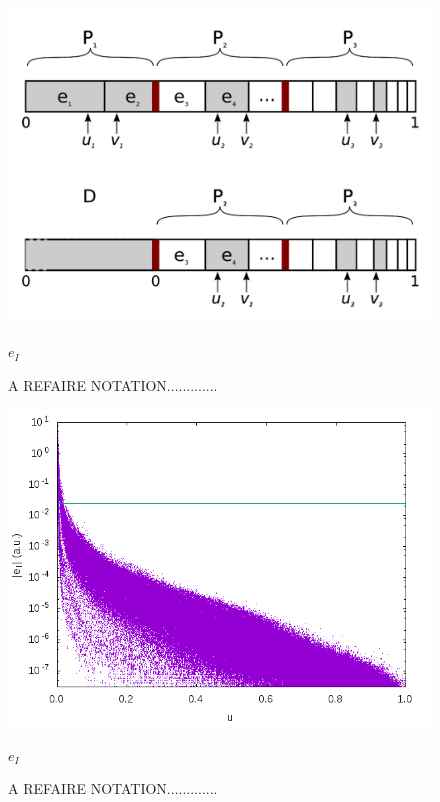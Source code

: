 \documentclass[./thesis.tex]{subfiles}
\begin{document}
\begin{figure}[h!]
	\begin{center}
		\includegraphics[width=0.9\columnwidth]{figures/pt2/move_to_deterministic}
		\caption{A REFAIRE NOTATION.............}
		\label{fig:move_to_deterministic}
		$e_I$
	\end{center}
\end{figure}

\begin{figure}[h!]
	\begin{center}
		\includegraphics[width=0.9\columnwidth]{figures/pt2/eI}
		\caption{A REFAIRE NOTATION.............}
		\label{fig:ei}
		$e_I$
	\end{center}
\end{figure}
\end{document}
